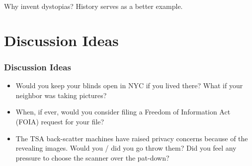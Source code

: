 \documentclass{beamer}
\begin{document}
\begin{frame}
\begin{columns}[c]
\begin{figure}
    \end{figure}

    \end{columns}

\begin{block}{Why invent dystopias?}
      History serves as a better example.
\end{block}


\end{frame}


\section{Discussion Ideas}

\begin{frame}
\frametitle{Discussion Ideas}

\begin{itemize}
\item Would you keep your blinds open in NYC if you lived there?  What
  if your neighbor was taking pictures?
\item When, if ever, would you consider filing a Freedom of
  Information Act (FOIA) request for your file?
\item The TSA back-scatter machines have raised privacy concerns
  because of the revealing images.  Would you / did you go throw them?
  Did you feel any pressure to choose the scanner over the pat-down?

\end{itemize}

\end{frame}
\end{document}
